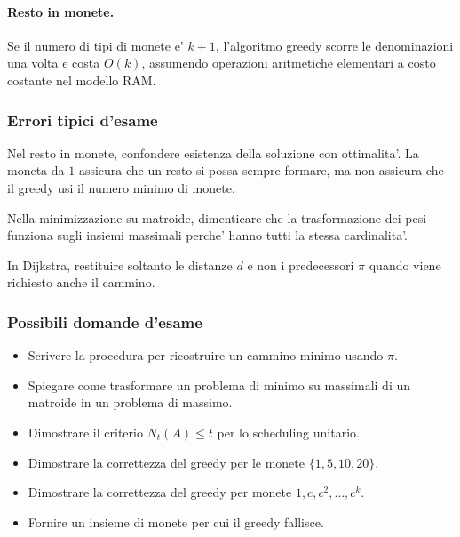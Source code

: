 \paragraph{Resto in monete.}
Se il numero di tipi di monete e' $k+1$, l'algoritmo greedy scorre le denominazioni una volta e costa $O(k)$, assumendo operazioni aritmetiche elementari a costo costante nel modello RAM.

\subsubsection{Errori tipici d'esame}
\begin{hardnote}
Nel resto in monete, confondere esistenza della soluzione con ottimalita'. La moneta da $1$ assicura che un resto si possa sempre formare, ma non assicura che il greedy usi il numero minimo di monete.
\end{hardnote}

\begin{hardnote}
Nella minimizzazione su matroide, dimenticare che la trasformazione dei pesi funziona sugli insiemi massimali perche' hanno tutti la stessa cardinalita'.
\end{hardnote}

\begin{hardnote}
In Dijkstra, restituire soltanto le distanze $d$ e non i predecessori $\pi$ quando viene richiesto anche il cammino.
\end{hardnote}

\subsubsection{Possibili domande d'esame}
\begin{itemize}
	\item Scrivere la procedura per ricostruire un cammino minimo usando $\pi$.
	\item Spiegare come trasformare un problema di minimo su massimali di un matroide in un problema di massimo.
	\item Dimostrare il criterio $N_t(A)\le t$ per lo scheduling unitario.
	\item Dimostrare la correttezza del greedy per le monete $\{1,5,10,20\}$.
	\item Dimostrare la correttezza del greedy per monete $1,c,c^2,\ldots,c^k$.
	\item Fornire un insieme di monete per cui il greedy fallisce.
\end{itemize}

